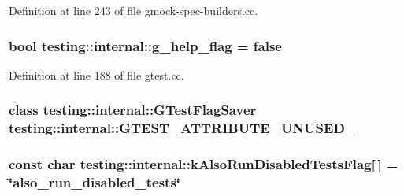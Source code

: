 Definition at line 243 of file gmock-\/spec-\/builders.\+cc.

\subsubsection[{\texorpdfstring{g\+\_\+help\+\_\+flag}{g_help_flag}}]{\setlength{\rightskip}{0pt plus 5cm}bool testing\+::internal\+::g\+\_\+help\+\_\+flag = false}\hypertarget{namespacetesting_1_1internal_a93a772f5e51973b105d91cbb66a203f4}{}\label{namespacetesting_1_1internal_a93a772f5e51973b105d91cbb66a203f4}


Definition at line 188 of file gtest.\+cc.

\subsubsection[{\texorpdfstring{G\+T\+E\+S\+T\+\_\+\+A\+T\+T\+R\+I\+B\+U\+T\+E\+\_\+\+U\+N\+U\+S\+E\+D\+\_\+}{GTEST_ATTRIBUTE_UNUSED_}}]{\setlength{\rightskip}{0pt plus 5cm}class {\bf testing\+::internal\+::\+G\+Test\+Flag\+Saver} testing\+::internal\+::\+G\+T\+E\+S\+T\+\_\+\+A\+T\+T\+R\+I\+B\+U\+T\+E\+\_\+\+U\+N\+U\+S\+E\+D\+\_\+}\hypertarget{namespacetesting_1_1internal_a581ac897511489c75a06aa328dcfb62f}{}\label{namespacetesting_1_1internal_a581ac897511489c75a06aa328dcfb62f}
\subsubsection[{\texorpdfstring{k\+Also\+Run\+Disabled\+Tests\+Flag}{kAlsoRunDisabledTestsFlag}}]{\setlength{\rightskip}{0pt plus 5cm}const char testing\+::internal\+::k\+Also\+Run\+Disabled\+Tests\+Flag\mbox{[}$\,$\mbox{]} = \char`\"{}also\+\_\+run\+\_\+disabled\+\_\+tests\char`\"{}}\hypertarget{namespacetesting_1_1internal_ad5882ed0ceadc0f23090f0f08b5d495b}{}\label{namespacetesting_1_1internal_ad5882ed0ceadc0f23090f0f08b5d495b}


